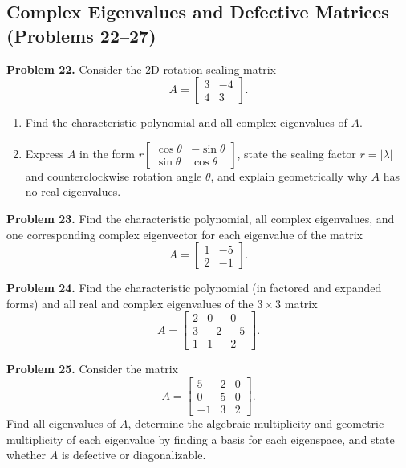 \documentclass[11pt, letterpaper]{article}
\theoremstyle{definition}
\theoremstyle{remark}
\begin{document}
\subsection{Complex Eigenvalues and Defective Matrices (Problems 22--27)}

\noindent\textbf{Problem 22.} Consider the 2D rotation-scaling matrix
\[
A = \begin{bmatrix} 3 & -4 \\ 4 & 3 \end{bmatrix}.
\]
\begin{enumerate}[label=(\alph*), topsep=3pt, itemsep=3pt]
    \item Find the characteristic polynomial and all complex eigenvalues of $A$.
    \item Express $A$ in the form $r \begin{bmatrix} \cos\theta & -\sin\theta \\ \sin\theta & \cos\theta \end{bmatrix}$, state the scaling factor $r = |\lambda|$ and counterclockwise rotation angle $\theta$, and explain geometrically why $A$ has no real eigenvalues.
\end{enumerate}

\noindent\textbf{Problem 23.} Find the characteristic polynomial, all complex eigenvalues, and one corresponding complex eigenvector for each eigenvalue of the matrix
\[
A = \begin{bmatrix} 1 & -5 \\ 2 & -1 \end{bmatrix}.
\]

\noindent\textbf{Problem 24.} Find the characteristic polynomial (in factored and expanded forms) and all real and complex eigenvalues of the $3 \times 3$ matrix
\[
A = \begin{bmatrix} 2 & 0 & 0 \\ 3 & -2 & -5 \\ 1 & 1 & 2 \end{bmatrix}.
\]

\noindent\textbf{Problem 25.} Consider the matrix
\[
A = \begin{bmatrix} 5 & 2 & 0 \\ 0 & 5 & 0 \\ -1 & 3 & 2 \end{bmatrix}.
\]
Find all eigenvalues of $A$, determine the algebraic multiplicity and geometric multiplicity of each eigenvalue by finding a basis for each eigenspace, and state whether $A$ is defective or diagonalizable.
\end{document}
